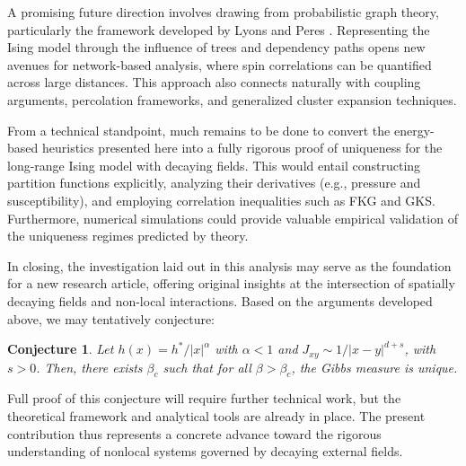 \documentclass{article}
\newtheorem{conjecture}[theorem]{Conjecture}
\begin{document}
A promising future direction involves drawing from probabilistic graph theory, particularly the framework developed by Lyons and Peres \cite{lyons2014}. Representing the Ising model through the influence of trees and dependency paths opens new avenues for network-based analysis, where spin correlations can be quantified across large distances. This approach also connects naturally with coupling arguments, percolation frameworks, and generalized cluster expansion techniques.

From a technical standpoint, much remains to be done to convert the energy-based heuristics presented here into a fully rigorous proof of uniqueness for the long-range Ising model with decaying fields. This would entail constructing partition functions explicitly, analyzing their derivatives (e.g., pressure and susceptibility), and employing correlation inequalities such as FKG and GKS. Furthermore, numerical simulations could provide valuable empirical validation of the uniqueness regimes predicted by theory.

In closing, the investigation laid out in this analysis may serve as the foundation for a new research article, offering original insights at the intersection of spatially decaying fields and non-local interactions. Based on the arguments developed above, we may tentatively conjecture:

\begin{conjecture}
Let $h(x) = h^*/|x|^\alpha$ with $\alpha<1$ and $J_{xy} \sim 1/|x-y|^{d+s}$, with $s>0$. Then, there exists $\beta_c$ such that for all $\beta>\beta_c$, the Gibbs measure is unique.
\end{conjecture}

Full proof of this conjecture will require further technical work, but the theoretical framework and analytical tools are already in place. The present contribution thus represents a concrete advance toward the rigorous understanding of nonlocal systems governed by decaying external fields.
\newpage

\end{document}
